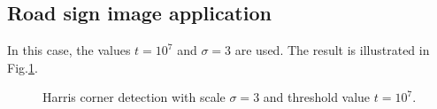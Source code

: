 \subsection{Road sign image application}
In this case, the values $t=10^7$ and $\sigma=3$ are used. The result is illustrated in Fig.\ref{fig:harris:matlab:roadsign}.

\begin{figure}[htbp]
\centering 
{}\hfill
{}
\caption{Harris corner detection with scale $\sigma=3$ and threshold value $t=10^7$.}
\label{fig:harris:matlab:roadsign}
\end{figure}
